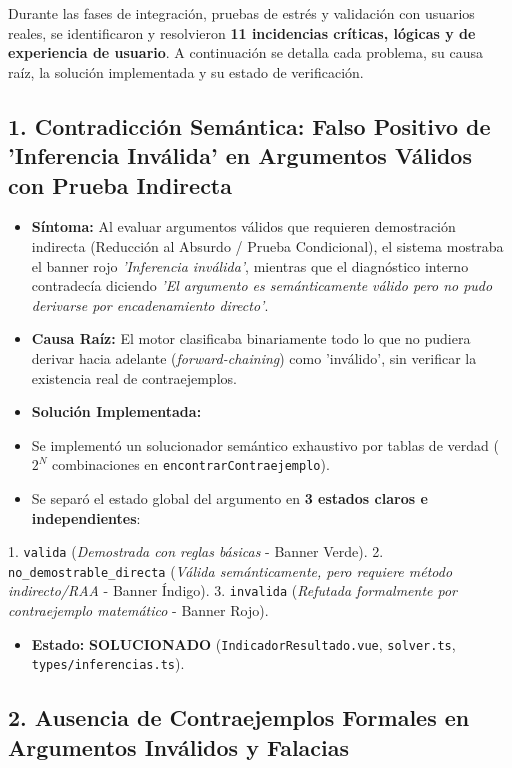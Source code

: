 \documentclass[11pt,a4paper,openany]{book}
\begin{document}
Durante las fases de integración, pruebas de estrés y validación con usuarios reales, se identificaron y resolvieron \textbf{11 incidencias críticas, lógicas y de experiencia de usuario}. A continuación se detalla cada problema, su causa raíz, la solución implementada y su estado de verificación.

\hrulefill

\subsection{1.  Contradicción Semántica: Falso Positivo de 'Inferencia Inválida' en Argumentos Válidos con Prueba Indirecta}

\begin{itemize}[leftmargin=*]
\item \textbf{Síntoma:} Al evaluar argumentos válidos que requieren demostración indirecta (Reducción al Absurdo / Prueba Condicional), el sistema mostraba el banner rojo \textit{'Inferencia inválida'}, mientras que el diagnóstico interno contradecía diciendo \textit{'El argumento es semánticamente válido pero no pudo derivarse por encadenamiento directo'}.
\item \textbf{Causa Raíz:} El motor clasificaba binariamente todo lo que no pudiera derivar hacia adelante (\textit{forward-chaining}) como 'inválido', sin verificar la existencia real de contraejemplos.
\item \textbf{Solución Implementada:}
\item Se implementó un solucionador semántico exhaustivo por tablas de verdad ($2^N$ combinaciones en \texttt{encontrarContraejemplo}).
\item Se separó el estado global del argumento en \textbf{3 estados claros e independientes}:
\end{itemize}
    1. \texttt{valida} (\textit{Demostrada con reglas básicas} - Banner Verde).
    2. \texttt{no\_demostrable\_directa} (\textit{Válida semánticamente, pero requiere método indirecto/RAA} - Banner Índigo).
    3. \texttt{invalida} (\textit{Refutada formalmente por contraejemplo matemático} - Banner Rojo).
\begin{itemize}[leftmargin=*]
\item \textbf{Estado:}  \textbf{SOLUCIONADO} (\texttt{IndicadorResultado.vue}, \texttt{solver.ts}, \texttt{types/inferencias.ts}).
\end{itemize}

\hrulefill

\subsection{2.  Ausencia de Contraejemplos Formales en Argumentos Inválidos y Falacias}
\end{document}
